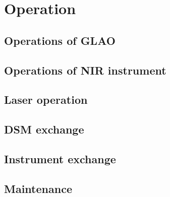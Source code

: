 \def\thisdir{operation/operation/}

\chapter{Operation
\label{chap:ope}}

\section{Operations of GLAO}
\section{Operations of NIR instrument}
\section{Laser operation}
\section{DSM exchange}
\section{Instrument exchange}
\section{Maintenance}
